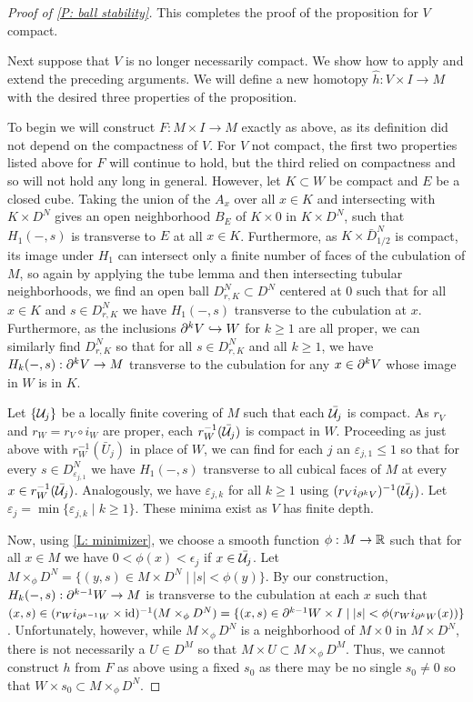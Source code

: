 \begin{proof}[Proof of \cref{P: ball stability}]
This completes the proof of the proposition for $V$ compact.


Next suppose that $V$ is no longer necessarily compact. We show how to apply and extend the preceding arguments. We will define a new homotopy $\hat h:V\times I\to M$ with the desired three properties of the proposition.

To begin we will construct $F:M\times I\to M$ exactly as above, as its definition did not depend on the compactness of $V$. For $V$ not compact, the first two properties listed above for $F$ will continue to hold, but the third relied on compactness and so will not hold any long in general. However, let
$K\subset W$ be compact and $E$ be a closed cube. Taking the union of the $A_x$ over all $x\in K$ and intersecting with $K\times D^N$ gives an open neighborhood $B_E$ of $K\times 0$ in $K\times D^N$, such that
 $H_1(-,s)$ is transverse to $E$ at all $x\in K$.
Furthermore, as $K\times \bar D^N_{1/2}$ is compact, its image under $H_1$ can intersect only a finite number of faces of the cubulation of $M$, so again by applying the tube lemma and then intersecting tubular neighborhoods, we find an open ball $D_{r,K}^N\subset D^N$ centered at $0$ such that for all $x\in K$ and $s\in D_{r,K}^N$ we have $H_1(-,s)$ transverse to the cubulation at $x$. Furthermore, as the inclusions $\partial^kV\hookrightarrow W$ for $k\geq 1$ are all proper, we can similarly find  $D_{r,K}^N$  so that for all $s\in D_{r,K}^N$ and all $k\geq 1$, we have $H_k(-,s):\partial^kV\to M$ transverse to the cubulation for any $x\in \partial^{k}V$ whose image in $W$ is in $K$.

 Let $\{\mathcal{U}_j\}$ be a locally finite covering of $M$ such that each $\bar{\mathcal{U}_j}$ is compact. As $r_V$ and  $r_W=r_V\circ i_{W}$ are proper, each $r^{-1}_W(\bar {\mathcal{U}_j})$ is compact in $W$. Proceeding as just above with $r_W^{-1}(\bar U_j)$ in place of $W$, we can find for each $j$ an $\varepsilon_{j,1}\leq 1$ so that  for every $s\in D^N_{\varepsilon_{j,1}}$ we have $H_1(-,s)$  transverse to all cubical faces of $M$ at every  $x\in r^{-1}_W(\bar {\mathcal{U}_j})$. Analogously, we have $\varepsilon_{j,k}$ for all $k\geq 1$ using $(r_Vi_{\partial^kV})^{-1}(\bar {\mathcal{U}_j})$. Let $\varepsilon_j=\min\{\varepsilon_{j,k}\mid k\geq 1\}$. These minima exist as $V$ has finite depth.

Now, using \cref{L: minimizer}, we choose  a smooth function $\phi:M\to \mathbb{R}$ such that for all $x\in M$ we have  $0<\phi(x)<\epsilon_j$ if $x\in \bar{\mathcal{U}_j}$. Let $M\times_\phi D^N=\{(y,s)\in M\times D^N\mid |s|<\phi(y)\}$. By our construction, $H_k(-,s):\partial^{k-1}W\to M$ is transverse to the cubulation at each $x$ such that $(x,s)\in(r_Wi_{\partial^{k-1}W}\times \mathrm{id})^{-1}(M\times_\phi D^N)=\{(x,s)\in \partial^{k-1}W\times I\mid |s|<\phi(r_Wi_{\partial^kW}(x))\}$. Unfortunately, however, while $M\times_\phi D^N$  is a neighborhood of $M\times 0$ in $M\times D^N$, there is not necessarily a $U\in D^M$ so that $M\times U\subset M\times_\phi D^M$. Thus,
we cannot construct $h$ from $F$ as above using a fixed $s_0$ as there may be no single $s_0\neq 0$ so that $W\times s_0\subset M\times_\phi D^N$.



\end{proof}
